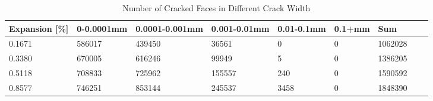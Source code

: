 
\begin{table}[ht!]
    \centering
    \begin{tabular}{| p{2.0cm} | p{1.6cm} | p{1.6cm} | p{1.6cm} | p{1.6cm} | p{1.6cm} | p{1.6cm} | p{1.6cm} | p{2.0cm} | }
    \hline

	Expansion [\%] & 0-0.0001mm & 0.0001-0.001mm & 0.001-0.01mm & 0.01-0.1mm & 0.1+mm & Sum \\ \hline

    0.1671 &	586017 &	439450 &	36561 &	0 &	0 &	1062028\\ \hline
    0.3380 &	670005 &	616246 &	99949 &	5 &	0 &	1386205\\ \hline
    0.5118 &	708833 &	725962 &	155557 &	240 &	0 &	1590592\\ \hline
    0.8577 &	746251 &	853144 &	245537 &	3458 &	0 &	1848390\\ \hline

    \end{tabular}
    \caption{Number of Cracked Faces in Different Crack Width}
    \label{}
\end{table}


